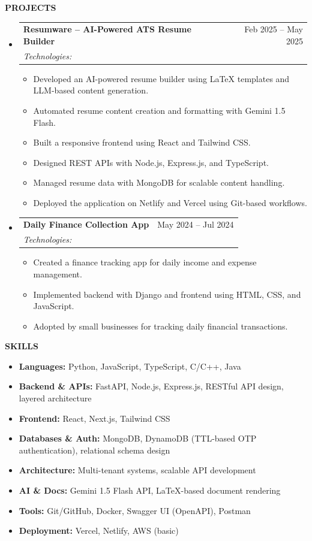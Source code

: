 \documentclass[a4paper,10pt]{article}
\makeatletter
\newcommand{\resheading}[1]{
  \vspace{8pt}
  {\color{black} \textbf{\large #1}}
  \vspace{-5pt}
  \hrulefill
  \vspace{3pt}
}
\newcommand{\ressubheading}[4]{
  \begin{tabular*}{\textwidth}{l@{\extracolsep{\fill}}r}
    \textbf{#1} & #2 \\
    \textit{\small #3} & \textit{\small #4} \\
  \end{tabular*}\vspace{-5pt}
}
\newcommand{\resitem}[1]{
  \item \small{
    {#1 \vspace{-2pt}}
  }
}
\makeatother
\begin{document}
\resheading{PROJECTS}
\begin{itemize}[leftmargin=*,nosep]
\item[] \ressubheading{Resumware – AI-Powered ATS Resume Builder}{Feb 2025 – May 2025}{Technologies: }{}
\begin{itemize}[leftmargin=12pt,nosep,topsep=2pt]
  \resitem{Developed an AI-powered resume builder using LaTeX templates and LLM-based content generation.}
  \resitem{Automated resume content creation and formatting with Gemini 1.5 Flash.}
  \resitem{Built a responsive frontend using React and Tailwind CSS.}
  \resitem{Designed REST APIs with Node.js, Express.js, and TypeScript.}
  \resitem{Managed resume data with MongoDB for scalable content handling.}
  \resitem{Deployed the application on Netlify and Vercel using Git-based workflows.}
\end{itemize}
\item[] \ressubheading{Daily Finance Collection App}{May 2024 – Jul 2024}{Technologies: }{}
\begin{itemize}[leftmargin=12pt,nosep,topsep=2pt]
  \resitem{Created a finance tracking app for daily income and expense management.}
  \resitem{Implemented backend with Django and frontend using HTML, CSS, and JavaScript.}
  \resitem{Adopted by small businesses for tracking daily financial transactions.}
\end{itemize}
\end{itemize}

\resheading{SKILLS}
\begin{itemize}[leftmargin=12pt,nosep,topsep=2pt]
  \item[] \small \textbf{Languages:} Python, JavaScript, TypeScript, C/C++, Java
  \item[] \small \textbf{Backend \& APIs:} FastAPI, Node.js, Express.js, RESTful API design, layered architecture
  \item[] \small \textbf{Frontend:} React, Next.js, Tailwind CSS
  \item[] \small \textbf{Databases \& Auth:} MongoDB, DynamoDB (TTL-based OTP authentication), relational schema design
  \item[] \small \textbf{Architecture:} Multi-tenant systems, scalable API development
  \item[] \small \textbf{AI \& Docs:} Gemini 1.5 Flash API, LaTeX-based document rendering
  \item[] \small \textbf{Tools:} Git/GitHub, Docker, Swagger UI (OpenAPI), Postman
  \item[] \small \textbf{Deployment:} Vercel, Netlify, AWS (basic)
\end{itemize}
\end{document}
